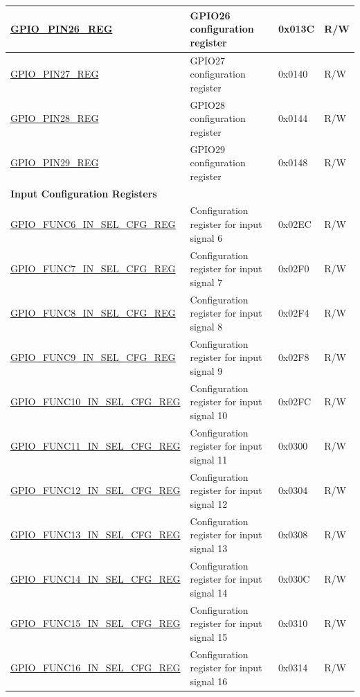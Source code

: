 \begin{longtable}{ | p{5.5cm} | p{6.2cm} | p{1.3cm} | p{2cm} | }
\hyperref[regdesc:GPIOPINNREG]{GPIO\_PIN26\_REG} & GPIO26 configuration register & 0x013C & R/W \\ \hline
\hyperref[regdesc:GPIOPINNREG]{GPIO\_PIN27\_REG} & GPIO27 configuration register & 0x0140 & R/W \\ \hline
\hyperref[regdesc:GPIOPINNREG]{GPIO\_PIN28\_REG} & GPIO28 configuration register & 0x0144 & R/W \\ \hline
\hyperref[regdesc:GPIOPINNREG]{GPIO\_PIN29\_REG} & GPIO29 configuration register & 0x0148 & R/W \\ \hline
\multicolumn{4}{|l|}{\textbf{Input Configuration Registers}} \\ \hline
\hyperref[regdesc:GPIOFUNCMINSELCFGREG]{GPIO\_FUNC6\_IN\_SEL\_CFG\_REG} & Configuration register for input signal 6 & 0x02EC & R/W \\ \hline
\hyperref[regdesc:GPIOFUNCMINSELCFGREG]{GPIO\_FUNC7\_IN\_SEL\_CFG\_REG} & Configuration register for input signal 7 & 0x02F0 & R/W \\ \hline
\hyperref[regdesc:GPIOFUNCMINSELCFGREG]{GPIO\_FUNC8\_IN\_SEL\_CFG\_REG} & Configuration register for input signal 8 & 0x02F4 & R/W \\ \hline
\hyperref[regdesc:GPIOFUNCMINSELCFGREG]{GPIO\_FUNC9\_IN\_SEL\_CFG\_REG} & Configuration register for input signal 9 & 0x02F8 & R/W \\ \hline
\hyperref[regdesc:GPIOFUNCMINSELCFGREG]{GPIO\_FUNC10\_IN\_SEL\_CFG\_REG} & Configuration register for input signal 10 & 0x02FC & R/W \\ \hline
\hyperref[regdesc:GPIOFUNCMINSELCFGREG]{GPIO\_FUNC11\_IN\_SEL\_CFG\_REG} & Configuration register for input signal 11 & 0x0300 & R/W \\ \hline
\hyperref[regdesc:GPIOFUNCMINSELCFGREG]{GPIO\_FUNC12\_IN\_SEL\_CFG\_REG} & Configuration register for input signal 12 & 0x0304 & R/W \\ \hline
\hyperref[regdesc:GPIOFUNCMINSELCFGREG]{GPIO\_FUNC13\_IN\_SEL\_CFG\_REG} & Configuration register for input signal 13 & 0x0308 & R/W \\ \hline
\hyperref[regdesc:GPIOFUNCMINSELCFGREG]{GPIO\_FUNC14\_IN\_SEL\_CFG\_REG} & Configuration register for input signal 14 & 0x030C & R/W \\ \hline
\hyperref[regdesc:GPIOFUNCMINSELCFGREG]{GPIO\_FUNC15\_IN\_SEL\_CFG\_REG} & Configuration register for input signal 15 & 0x0310 & R/W \\ \hline
\hyperref[regdesc:GPIOFUNCMINSELCFGREG]{GPIO\_FUNC16\_IN\_SEL\_CFG\_REG} & Configuration register for input signal 16 & 0x0314 & R/W \\ \hline

\end{longtable}
